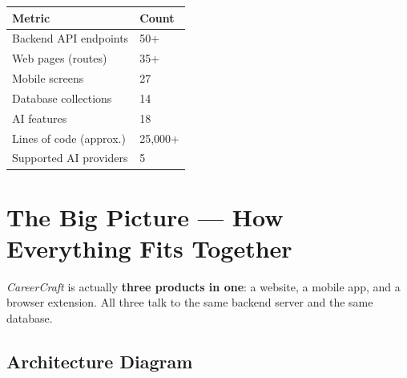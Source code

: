 \documentclass[12pt, a4paper]{report}
\newcommand{\cc}{\textit{CareerCraft}}
\begin{document}
\begin{center}
\begin{tabular}{ll}
\toprule
\textbf{Metric} & \textbf{Count} \\
\midrule
Backend API endpoints & 50+ \\
Web pages (routes) & 35+ \\
Mobile screens & 27 \\
Database collections & 14 \\
AI features & 18 \\
Lines of code (approx.) & 25{,}000+ \\
Supported AI providers & 5 \\
\bottomrule
\end{tabular}
\end{center}

\chapter{The Big Picture --- How Everything Fits Together}

\cc{} is actually \textbf{three products in one}: a website, a mobile app, and a
browser extension.  All three talk to the same backend server and the same database.

\section{Architecture Diagram}
\end{document}
